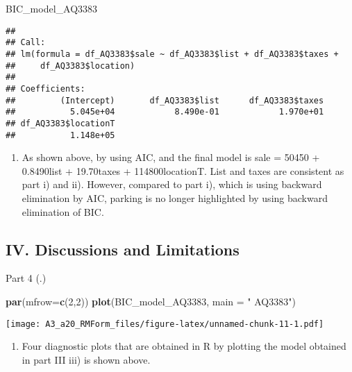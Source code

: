 \documentclass[
]{article}
\newenvironment{Shaded}{\begin{snugshade}}{\end{snugshade}}
\newcommand{\DataTypeTok}[1]{\textcolor[rgb]{0.13,0.29,0.53}{#1}}
\newcommand{\DecValTok}[1]{\textcolor[rgb]{0.00,0.00,0.81}{#1}}
\newcommand{\KeywordTok}[1]{\textcolor[rgb]{0.13,0.29,0.53}{\textbf{#1}}}
\newcommand{\NormalTok}[1]{#1}
\newcommand{\StringTok}[1]{\textcolor[rgb]{0.31,0.60,0.02}{#1}}
\providecommand{\tightlist}{%
  \setlength{\itemsep}{0pt}\setlength{\parskip}{0pt}}
\begin{document}
\begin{Shaded}
\begin{Highlighting}[]
\NormalTok{BIC_model_AQ3383}
\end{Highlighting}
\end{Shaded}

\begin{verbatim}
## 
## Call:
## lm(formula = df_AQ3383$sale ~ df_AQ3383$list + df_AQ3383$taxes + 
##     df_AQ3383$location)
## 
## Coefficients:
##         (Intercept)       df_AQ3383$list      df_AQ3383$taxes  
##           5.045e+04            8.490e-01            1.970e+01  
## df_AQ3383$locationT  
##           1.148e+05
\end{verbatim}

\begin{enumerate}
\def\labelenumi{\roman{enumi})}
\setcounter{enumi}{2}
\tightlist
\item
  As shown above, by using AIC, and the final model is sale = 50450 +
  0.8490list + 19.70taxes + 114800locationT. List and taxes are
  consistent as part i) and ii). However, compared to part i), which is
  using backward elimination by AIC, parking is no longer highlighted by
  using backward elimination of BIC.
\end{enumerate}

\hypertarget{iv.-discussions-and-limitations}{%
\subsection{IV. Discussions and
Limitations}\label{iv.-discussions-and-limitations}}

Part 4 (.)

\begin{Shaded}
\begin{Highlighting}[]
\KeywordTok{par}\NormalTok{(}\DataTypeTok{mfrow=}\KeywordTok{c}\NormalTok{(}\DecValTok{2}\NormalTok{,}\DecValTok{2}\NormalTok{))}
\KeywordTok{plot}\NormalTok{(BIC_model_AQ3383, }\DataTypeTok{main =} \StringTok{"                                              AQ3383"}\NormalTok{)}
\end{Highlighting}
\end{Shaded}

\texttt{[image: A3\_a20\_RMForm\_files/figure-latex/unnamed-chunk-11-1.pdf]}

\begin{enumerate}
\def\labelenumi{\alph{enumi})}
\tightlist
\item
  Four diagnostic plots that are obtained in R by plotting the model
  obtained in part III iii) is shown above.
\end{enumerate}
\end{document}
